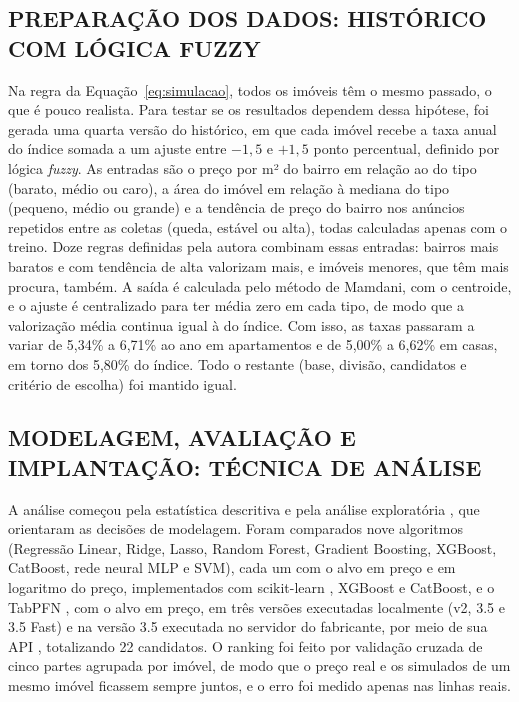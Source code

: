 \documentclass[
  article,
  a4paper,
  12pt,
  fleqn,
  oneside,
  chapter = TITLE,
  section = TITLE,
]{abntex2}
\begin{document}
\subsection{PREPARAÇÃO DOS DADOS: HISTÓRICO COM LÓGICA FUZZY}\label{sec:fuzzy}

Na regra da Equação~\ref{eq:simulacao}, todos os imóveis têm o mesmo passado, o que é pouco realista. Para testar se os resultados dependem dessa hipótese, foi gerada uma quarta versão do histórico, em que cada imóvel recebe a taxa anual do índice somada a um ajuste entre $-1{,}5$ e $+1{,}5$ ponto percentual, definido por lógica \textit{fuzzy}. As entradas são o preço por m² do bairro em relação ao do tipo (barato, médio ou caro), a área do imóvel em relação à mediana do tipo (pequeno, médio ou grande) e a tendência de preço do bairro nos anúncios repetidos entre as coletas (queda, estável ou alta), todas calculadas apenas com o treino. Doze regras definidas pela autora combinam essas entradas: bairros mais baratos e com tendência de alta valorizam mais, e imóveis menores, que têm mais procura, também. A saída é calculada pelo método de Mamdani, com o centroide, e o ajuste é centralizado para ter média zero em cada tipo, de modo que a valorização média continua igual à do índice. Com isso, as taxas passaram a variar de 5,34\% a 6,71\% ao ano em apartamentos e de 5,00\% a 6,62\% em casas, em torno dos 5,80\% do índice. Todo o restante (base, divisão, candidatos e critério de escolha) foi mantido igual.

\subsection{MODELAGEM, AVALIAÇÃO E IMPLANTAÇÃO: TÉCNICA DE ANÁLISE}\label{sec:tecnica}

A análise começou pela estatística descritiva e pela análise exploratória \cite{tukey1977}, que orientaram as decisões de modelagem. Foram comparados nove algoritmos (Regressão Linear, Ridge, Lasso, Random Forest, Gradient Boosting, XGBoost, CatBoost, rede neural MLP e SVM), cada um com o alvo em preço e em logaritmo do preço, implementados com scikit-learn \cite{pedregosa2011}, XGBoost e CatBoost, e o TabPFN \cite{hollmann2025}, com o alvo em preço, em três versões executadas localmente (v2, 3.5 e 3.5 Fast) e na versão 3.5 executada no servidor do fabricante, por meio de sua API \cite{priorlabs}, totalizando 22 candidatos. O ranking foi feito por validação cruzada de cinco partes agrupada por imóvel, de modo que o preço real e os simulados de um mesmo imóvel ficassem sempre juntos, e o erro foi medido apenas nas linhas reais.
\end{document}

